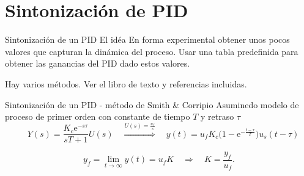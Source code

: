 \documentclass[presentation,aspectratio=1610]{beamer}
\begin{document}
\section{Sintonización de PID}
\label{sec:orgdc29a96}
\begin{frame}[label={sec:org8a3fb95}]{Sintonización de un PID}
\alert{El idéa} En forma experimental obtener unos pocos valores que capturan la dinámica del proceso. Usar una tabla predefinida para obtener las ganancias del PID dado estos valores.

Hay varios métodos. Ver el libro de texto y referencias incluidas.
\end{frame}

\begin{frame}[label={sec:org51b3291}]{Sintonización de un PID - método de Smith \& Corripio}
Asuminedo modelo de proceso de primer orden con constante de tiempo \(T\) y retraso \(\tau\)
\[  \quad Y(s) = \frac{K_c\mathrm{e}^{-s\tau}}{sT + 1}U(s) \quad \overset{U(s) = \frac{u_f}{s}}{\Longrightarrow} \quad y(t) = u_f K_c\big( 1 - \mathrm{e}^{-\frac{t-\tau}{T}}\big)u_s(t-\tau)\]
\def\Tcnst{3}
\def\tdelay{0.6}
\def\ggain{2}
\def\uampl{0.8}
\pgfmathsetmacro{\yfinal}{\uampl*\ggain}
\pgfmathsetmacro{\tone}{\tdelay + \Tcnst/3}
\pgfmathsetmacro{\two}{\tdelay + \Tcnst}

\begin{center}
\end{center}

\[ y_f = \lim_{t\to\infty} y(t) = u_f K \quad \Rightarrow \quad K = \frac{y_f}{u_f}. \]
\end{frame}
\end{document}
